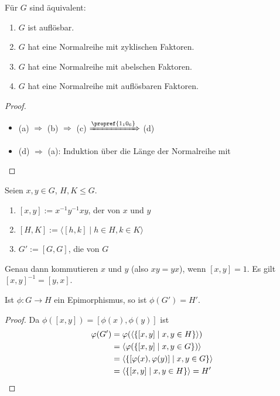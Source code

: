 \begin{proposition}
	Für $G$ sind äquivalent:
	\begin{enumerate}[label=(\alph*)]
		\item $G$ ist auflösbar.
		\item $G$ hat eine Normalreihe mit zyklischen Faktoren.
		\item $G$ hat eine Normalreihe mit abelschen Faktoren.
		\item $G$ hat eine Normalreihe mit auflösbaren Faktoren.
	\end{enumerate}
\end{proposition}
\begin{proof}
		\begin{itemize}
			\item (a) $\Rightarrow$ (b) $\Rightarrow$ (c) $\xRightarrow{\propref{1_10_6}}$ (d)
			\item (d) $\Rightarrow$ (a): Induktion über die Länge der Normalreihe mit 
		\end{itemize}
\end{proof}

\begin{definition}
	Seien $x,y \in G$, $H,K \leq G$.
	\begin{enumerate}[label=(\alph*)]
		\item $[x,y] := x^{-1}y^{-1}xy$, der  von $x$ und $y$
		\item $[H,K] := \langle[h,k]\mid h \in H, k\in K\rangle$
		\item $G' := [G,G]$, die  von $G$
	\end{enumerate}
\end{definition}

\begin{remark}
	Genau dann kommutieren $x$ und $y$ (also $xy = yx$), wenn $[x,y] = 1$. Es gilt $[x,y]^{-1} = [y,x]$.
\end{remark}

\begin{lemma}
	Ist $\phi: G \to H$ ein Epimorphismus, so ist $\phi(G') = H'$.
\end{lemma}
\begin{proof}
	Da $\phi([x,y]) = [\phi(x),\phi(y)]$ ist
	\begin{align}
	\phi(G') &= \phi(\langle\{ [x,y] \mid x,y \in H \}\rangle)\notag\\
	&= \langle\phi(\{[x,y] \mid x,y \in G\}) \rangle \notag\\
	&= \langle\{[\phi(x),\phi(y)] \mid x,y \in G\}\rangle\notag \\
	&= \langle \{ [x,y] \mid x,y \in H \}\rangle = H' \notag
	\end{align}
\end{proof}

